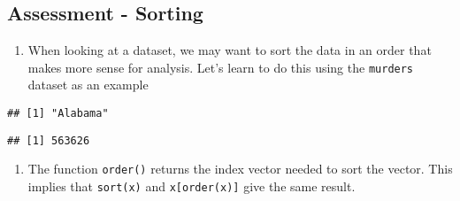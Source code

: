 \documentclass[]{article}
\newenvironment{Shaded}{\begin{snugshade}}{\end{snugshade}}
\newcommand{\CommentTok}[1]{\textcolor[rgb]{0.56,0.35,0.01}{\textit{#1}}}
\newcommand{\DecValTok}[1]{\textcolor[rgb]{0.00,0.00,0.81}{#1}}
\newcommand{\KeywordTok}[1]{\textcolor[rgb]{0.13,0.29,0.53}{\textbf{#1}}}
\newcommand{\NormalTok}[1]{#1}
\newcommand{\OperatorTok}[1]{\textcolor[rgb]{0.81,0.36,0.00}{\textbf{#1}}}
\newcommand{\StringTok}[1]{\textcolor[rgb]{0.31,0.60,0.02}{#1}}
\providecommand{\tightlist}{%
  \setlength{\itemsep}{0pt}\setlength{\parskip}{0pt}}
\begin{document}
\hypertarget{assessment---sorting}{%
\subsection{Assessment - Sorting}\label{assessment---sorting}}

\begin{enumerate}
\def\labelenumi{\arabic{enumi}.}
\tightlist
\item
  When looking at a dataset, we may want to sort the data in an order
  that makes more sense for analysis. Let's learn to do this using the
  \texttt{murders} dataset as an example
\end{enumerate}

\begin{Shaded}
\end{Shaded}

\begin{verbatim}
## [1] "Alabama"
\end{verbatim}

\begin{Shaded}
\end{Shaded}

\begin{verbatim}
## [1] 563626
\end{verbatim}

\begin{enumerate}
\def\labelenumi{\arabic{enumi}.}
\setcounter{enumi}{1}
\tightlist
\item
  The function \texttt{order()} returns the index vector needed to sort
  the vector. This implies that \texttt{sort(x)} and
  \texttt{x{[}order(x){]}} give the same result.
\end{enumerate}
\end{document}
